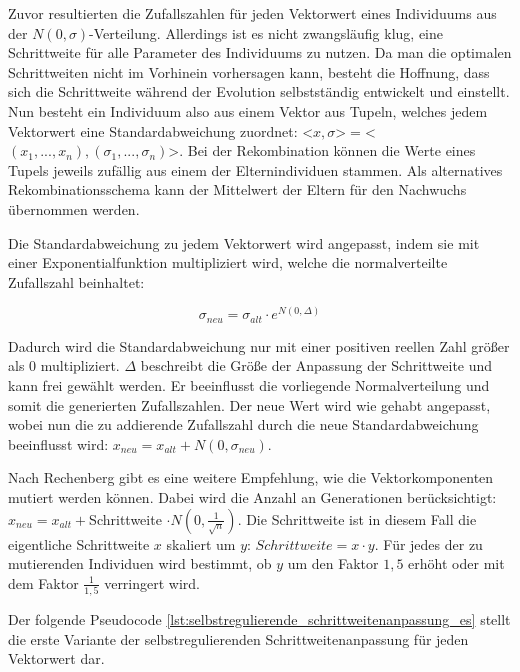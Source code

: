 Zuvor resultierten die Zufallszahlen für jeden Vektorwert eines Individuums aus der $N(0, \sigma)$-Verteilung. Allerdings ist es nicht zwangsläufig klug, eine Schrittweite für alle Parameter des Individuums zu nutzen. Da man die optimalen Schrittweiten nicht im Vorhinein vorhersagen kann, besteht die Hoffnung, dass sich die Schrittweite während der Evolution selbstständig entwickelt und einstellt. Nun besteht ein Individuum also aus einem Vektor aus Tupeln, welches jedem Vektorwert eine Standardabweichung zuordnet: <$x, \sigma$>$ =$<$(x_1,...,x_n), (\sigma_1,...,\sigma_n)$>. Bei der Rekombination können die Werte eines Tupels jeweils zufällig aus einem der Elternindividuen stammen. Als alternatives Rekombinationsschema kann der Mittelwert der Eltern für den Nachwuchs übernommen werden.

Die Standardabweichung zu jedem Vektorwert wird angepasst, indem sie mit einer Exponentialfunktion multipliziert wird, welche die normalverteilte Zufallszahl beinhaltet:

\begin{equation}
\sigma_{neu} = \sigma_{alt} \cdot e^{N(0, \Delta)}
\end{equation}

Dadurch wird die Standardabweichung nur mit einer positiven reellen Zahl größer als $0$ multipliziert. $\Delta$ beschreibt die Größe der Anpassung der Schrittweite und kann frei gewählt werden. Er beeinflusst die vorliegende Normalverteilung und somit die generierten Zufallszahlen. Der neue Wert wird wie gehabt angepasst, wobei nun die zu addierende Zufallszahl durch die neue Standardabweichung beeinflusst wird: $x_{neu} = x_{alt} + N(0, \sigma_{neu})$.

Nach Rechenberg gibt es eine weitere Empfehlung, wie die Vektorkomponenten mutiert werden können. Dabei wird die Anzahl an Generationen berücksichtigt: $x_{neu} = x_{alt} + $Schrittweite $\cdot N(0, \frac{1}{\sqrt{n}})$. Die Schrittweite ist in diesem Fall die eigentliche Schrittweite $x$ skaliert um $y$: $Schrittweite = x \cdot y$. Für jedes der zu mutierenden Individuen wird bestimmt, ob $y$ um den Faktor $1,5$ erhöht oder mit dem Faktor $\frac{1}{1,5}$ verringert wird.

Der folgende Pseudocode \ref{lst:selbstregulierende_schrittweitenanpassung_es} stellt die erste Variante der selbstregulierenden Schrittweitenanpassung für jeden Vektorwert dar.

